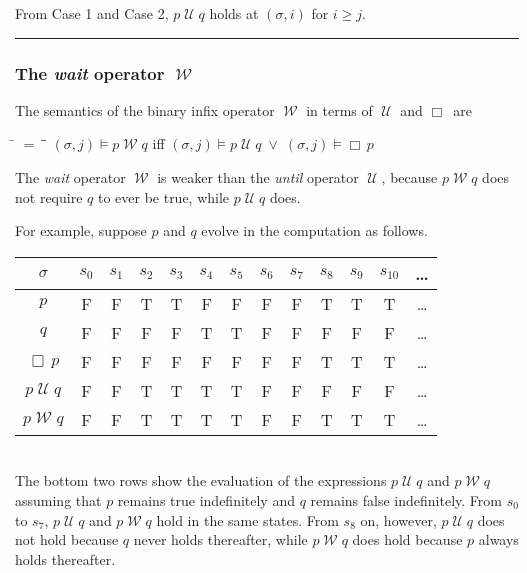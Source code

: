 \documentclass[12pt, fleqn, leqno]{article}
\newcommand{\lllgap}{12pt}                          %
\newcommand{\mymathindent}{24pt}                    %
\newcommand{\Until}{\;\mathcal{U}\;}
\newcommand{\Wait}{\;\mathcal{W}\;}
\newcommand{\Always}{\Box\,}
\newcommand{\myqed}{\rule[-.23ex]{1.2ex}{2.0ex}}
\newcommand{\myqedtab}{\hspace{384pt}}              %
\begin{document}
From Case 1 and Case 2, $p\Until q$ holds at $(\sigma,i)$ for $i\ge j$. \quad \myqed

\subsubsection*{The \textit{wait} operator $\Wait$}

The semantics of the binary infix operator $\Wait$ in terms of $\Until$ and $\Always$ are
\begin{tabbing}
\hspace{\mymathindent} \= $= \;$ \= \myqedtab \= \kill
  \> $(\sigma, j) \models p \Wait q$ \quad iff \quad $(\sigma, j) \models p \Until q \; \lor \; (\sigma, j) \models \Always p$
\end{tabbing}
The \textit{wait} operator $\Wait$ is weaker than the \textit{until} operator $\Until$, because $p\Wait q$ does not require $q$ to ever be true,
while $p\Until q$ does.

For example, suppose $p$ and $q$ evolve in the computation as follows.\\[\lllgap]
\begin{tabular}{c|cccccccccccc}
  $\sigma$       & $s_0$ & $s_1$ & $s_2$ & $s_3$ & $s_4$ & $s_5$ & $s_6$ & $s_7$ & $s_8$& $s_9$  & $s_{10}$&  \dots \\
  \hline
  $p$            & F     & F     & T     & T     & F     & F     & F     & F     & T     & T     & T     &  \dots\\
  $q$            & F     & F     & F     & F     & T     & T     & F     & F     & F     & F     & F     &  \dots\\
  $\Always p$    & F     & F     & F     & F     & F     & F     & F     & F     & T     & T     & T     &  \dots\\
  $p\Until q$    & F     & F     & T     & T     & T     & T     & F     & F     & F     & F     & F     &  \dots\\
  $p\Wait q$     & F     & F     & T     & T     & T     & T     & F     & F     & T     & T     & T     &  \dots\\
\end{tabular}\\[\lllgap]
The bottom two rows show the evaluation of the expressions $p\Until q$ and $p\Wait q$
assuming that $p$ remains true indefinitely and $q$ remains false indefinitely.
From $s_0$ to $s_7$, $p\Until q$ and $p\Wait q$ hold in the same states.
From $s_8$ on, however, $p\Until q$ does not hold because $q$ never holds thereafter,
while $p\Wait q$ does hold because $p$ always holds thereafter.
\end{document}
